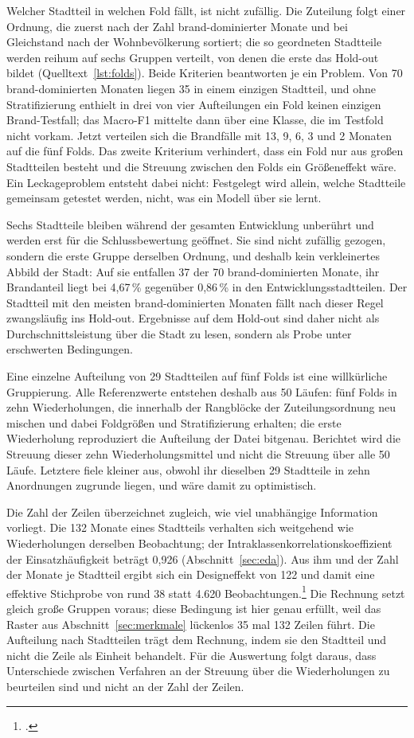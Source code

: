 Welcher Stadtteil in welchen Fold fällt, ist nicht zufällig. Die Zuteilung
folgt einer Ordnung, die zuerst nach der Zahl brand-dominierter Monate und bei
Gleichstand nach der Wohnbevölkerung sortiert; die so geordneten Stadtteile
werden reihum auf sechs Gruppen verteilt, von denen die erste das Hold-out
bildet (Quelltext~\ref{lst:folds}). Beide Kriterien beantworten je ein Problem.
Von 70 brand-dominierten Monaten liegen 35 in einem einzigen Stadtteil, und
ohne Stratifizierung enthielt in drei von vier Aufteilungen ein Fold keinen
einzigen Brand-Testfall; das Macro-F1 mittelte dann über eine Klasse, die im
Testfold nicht vorkam. Jetzt verteilen sich die Brandfälle mit 13, 9, 6, 3 und
2 Monaten auf die fünf Folds. Das zweite Kriterium verhindert, dass ein Fold
nur aus großen Stadtteilen besteht und die Streuung zwischen den Folds ein
Größeneffekt wäre. Ein Leckageproblem entsteht dabei nicht: Festgelegt wird
allein, welche Stadtteile gemeinsam getestet werden, nicht, was ein Modell über
sie lernt.

Sechs Stadtteile bleiben während der gesamten Entwicklung unberührt und werden
erst für die Schlussbewertung geöffnet. Sie sind nicht zufällig gezogen,
sondern die erste Gruppe derselben Ordnung, und deshalb kein verkleinertes
Abbild der Stadt: Auf sie entfallen 37 der 70 brand-dominierten Monate, ihr
Brandanteil liegt bei 4,67\,\% gegenüber 0,86\,\% in den
Entwicklungsstadtteilen. Der Stadtteil mit den meisten brand-dominierten
Monaten fällt nach dieser Regel zwangsläufig ins Hold-out. Ergebnisse auf dem
Hold-out sind daher nicht als Durchschnittsleistung über die Stadt zu lesen,
sondern als Probe unter erschwerten Bedingungen.

Eine einzelne Aufteilung von 29 Stadtteilen auf fünf Folds ist eine
willkürliche Gruppierung. Alle Referenzwerte entstehen deshalb aus 50 Läufen:
fünf Folds in zehn Wiederholungen, die innerhalb der Rangblöcke der
Zuteilungsordnung neu mischen und dabei Foldgrößen und Stratifizierung
erhalten; die erste Wiederholung reproduziert die Aufteilung der Datei
bitgenau. Berichtet wird die Streuung dieser zehn Wiederholungsmittel und nicht
die Streuung über alle 50 Läufe. Letztere fiele kleiner aus, obwohl ihr
dieselben 29 Stadtteile in zehn Anordnungen zugrunde liegen, und wäre damit zu
optimistisch.

Die Zahl der Zeilen überzeichnet zugleich, wie viel unabhängige Information
vorliegt. Die 132 Monate eines Stadtteils verhalten sich weitgehend wie
Wiederholungen derselben Beobachtung; der Intraklassenkorrelationskoeffizient
der Einsatzhäufigkeit beträgt 0,926 (Abschnitt~\ref{sec:eda}). Aus ihm und der
Zahl der Monate je Stadtteil ergibt sich ein Designeffekt von 122 und damit
eine effektive Stichprobe von rund 38 statt 4.620
Beobachtungen.\footcite[206]{Killip2004} Die Rechnung setzt gleich große
Gruppen voraus; diese Bedingung ist hier genau erfüllt, weil das Raster aus
Abschnitt~\ref{sec:merkmale} lückenlos 35 mal 132 Zeilen führt. Die Aufteilung
nach Stadtteilen trägt dem Rechnung, indem sie den Stadtteil und nicht die
Zeile als Einheit behandelt. Für die Auswertung folgt daraus, dass Unterschiede
zwischen Verfahren an der Streuung über die Wiederholungen zu beurteilen sind
und nicht an der Zahl der Zeilen.

